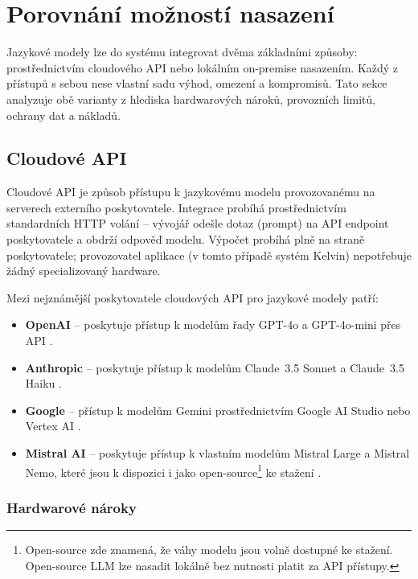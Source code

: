 \section{Porovnání možností nasazení}
\label{sec:selection-deployment}

Jazykové modely lze do systému integrovat dvěma základními způsoby: prostřednictvím cloudového API nebo lokálním on-premise nasazením.
Každý z přístupů s sebou nese vlastní sadu výhod, omezení a kompromisů.
Tato sekce analyzuje obě varianty z hlediska hardwarových nároků, provozních limitů, ochrany dat a nákladů.

\subsection{Cloudové API}
\label{subsec:deployment-cloud}

Cloudové API je způsob přístupu k jazykovému modelu provozovanému na serverech externího poskytovatele.
Integrace probíhá prostřednictvím standardních HTTP volání -- vývojář odešle dotaz (prompt) na API endpoint poskytovatele a obdrží odpověď modelu.
Výpočet probíhá plně na straně poskytovatele; provozovatel aplikace (v tomto případě systém Kelvin) nepotřebuje žádný specializovaný hardware.

Mezi nejznámější poskytovatele cloudových API pro jazykové modely patří:
\begin{itemize}
    \item \textbf{OpenAI} -- poskytuje přístup k modelům řady GPT-4o a GPT-4o-mini přes API \cite{openai_api}.
    \item \textbf{Anthropic} -- poskytuje přístup k modelům Claude~3.5 Sonnet a Claude~3.5 Haiku \cite{anthropic_api}.
    \item \textbf{Google} -- přístup k modelům Gemini prostřednictvím Google AI Studio nebo Vertex AI \cite{google_vertex}.
    \item \textbf{Mistral AI} -- poskytuje přístup k vlastním modelům Mistral Large a Mistral Nemo, které jsou k dispozici i jako open-source\footnote{Open-source zde znamená, že váhy modelu jsou volně dostupné ke stažení. Open-source LLM lze nasadit lokálně bez nutnosti platit za API přístupy.} ke stažení \cite{mistral2023}.
\end{itemize}

\subsubsection*{Hardwarové nároky}

